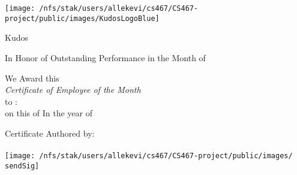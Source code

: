 \documentclass[landscape, 14pt]{article}
\begin{document}
\centering
\begin{minipage}{.9\textwidth}
\centering
\texttt{[image: /nfs/stak/users/allekevi/cs467/CS467-project/public/images/KudosLogoBlue]}
\end{minipage}

\Huge Kudos\\
\vspace{1cm}

\Huge In Honor of Outstanding Performance in the Month of
 \monVar \par
\smallskip
{\Large We Award this\\}
\smallskip
\textit{\huge Certificate of Employee of the Month\\}
\smallskip
{\Large to : \recvVar\\}
\smallskip
{\large on this \dayVar of \monVar In the year of \yearVar\\}
\vspace{.5cm}
\begin{minipage}[t]{0.5\textwidth}
\centering
{\large Certificate Authored by:\\}
{\large \sendVar\\}
\texttt{[image: /nfs/stak/users/allekevi/cs467/CS467-project/public/images/\\sendSig]}
\end{minipage}
\end{document}
